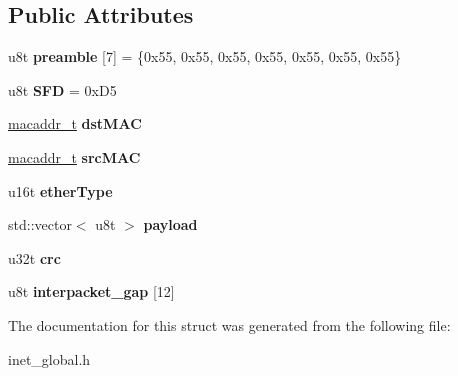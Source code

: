 \subsection*{Public Attributes}
\begin{DoxyCompactItemize}
\item 
\mbox{\label{structeth__frame__t_a7e917da155e1a71584d77ba116c51537}} 
u8t {\bfseries preamble} \mbox{[}7\mbox{]} = \{0x55, 0x55, 0x55, 0x55, 0x55, 0x55, 0x55\}
\item 
\mbox{\label{structeth__frame__t_a2373b35ac05da6d436fa1369a9868417}} 
u8t {\bfseries S\+FD} = 0x\+D5
\item 
\mbox{\label{structeth__frame__t_ac8ac769f22710edece8c5de6f206b793}} 
\mbox{\hyperlink{structmacaddr__t}{macaddr\+\_\+t}} {\bfseries dst\+M\+AC}
\item 
\mbox{\label{structeth__frame__t_a23bd734d1f17859fca7aa01cf036e21d}} 
\mbox{\hyperlink{structmacaddr__t}{macaddr\+\_\+t}} {\bfseries src\+M\+AC}
\item 
\mbox{\label{structeth__frame__t_a955b35cc93d08eab023f0fa1383a6107}} 
u16t {\bfseries ether\+Type}
\item 
\mbox{\label{structeth__frame__t_aa4b072edd94e393936b674c077dcf001}} 
std\+::vector$<$ u8t $>$ {\bfseries payload}
\item 
\mbox{\label{structeth__frame__t_ab479ce46f2f16015beb4f05eccae7b52}} 
u32t {\bfseries crc}
\item 
\mbox{\label{structeth__frame__t_aa64d327330c12dd5675c9b3ea5b717db}} 
u8t {\bfseries interpacket\+\_\+gap} \mbox{[}12\mbox{]}
\end{DoxyCompactItemize}


The documentation for this struct was generated from the following file\+:\begin{DoxyCompactItemize}
\item 
inet\+\_\+global.\+h\end{DoxyCompactItemize}
